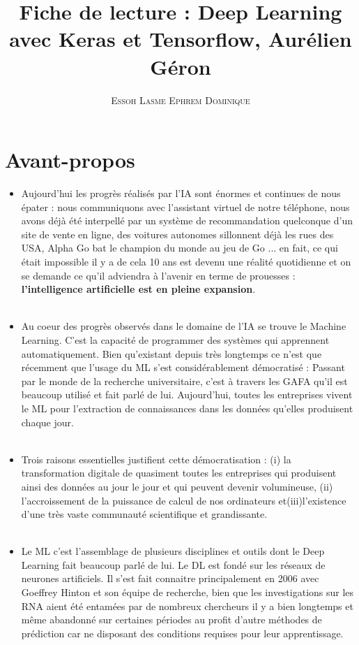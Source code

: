 \documentclass[executivepaper]{article}
\title{\textbf{\Huge{Fiche de lecture : Deep Learning avec Keras et Tensorflow, Aurélien Géron}}}
\author{\textsc{Essoh Lasme Ephrem Dominique}}
\begin{document}
	
\maketitle

	\section{Avant-propos}

\begin{itemize}


\item Aujourd'hui les progrès réalisés par l'IA sont énormes et continues de nous épater : nous communiquons avec l'assistant virtuel de notre téléphone, nous avons déjà été interpellé par un système de recommandation quelconque d'un site de vente en ligne, des voitures autonomes sillonnent déjà les rues des USA, Alpha Go bat le champion du monde au jeu de Go ... en fait, ce qui était impossible il y a de cela 10 ans est devenu une réalité quotidienne et on se demande ce qu'il adviendra à l'avenir en terme de prouesses : \textbf{l'intelligence artificielle est en pleine expansion}.\\~\

\item Au coeur des progrès observés dans le domaine de l'IA se trouve le Machine Learning. C'est la capacité de programmer des systèmes qui apprennent automatiquement. Bien qu'existant depuis très longtemps ce n'est que récemment que l'usage du ML s'est considérablement démocratisé : Passant par le monde de la recherche universitaire, c'est à travers les GAFA qu'il est beaucoup utilisé et fait parlé de lui. Aujourd'hui, toutes les entreprises vivent le ML pour l'extraction de connaissances dans les données qu'elles produisent chaque jour.\\~\
\item  Trois raisons essentielles justifient cette démocratisation : (i) la transformation digitale de quasiment toutes les entreprises qui produisent ainsi des données au jour le jour et qui peuvent devenir volumineuse, (ii) l'accroissement de la puissance de calcul de nos ordinateurs et(iii)l'existence d'une très vaste communauté scientifique et grandissante.\\~\

\item Le ML c'est l'assemblage de plusieurs disciplines et outils dont le Deep Learning fait beaucoup parlé de lui. Le DL est fondé sur les réseaux de neurones artificiels. Il s'est fait connaitre principalement en 2006 avec Goeffrey Hinton et son équipe de recherche, bien que les investigations sur les RNA aient été entamées par de nombreux chercheurs il y a bien longtemps et même abandonné sur certaines périodes au profit d'autre méthodes de prédiction car ne disposant des conditions requises pour leur apprentissage. 
\end{itemize}
\end{document}
